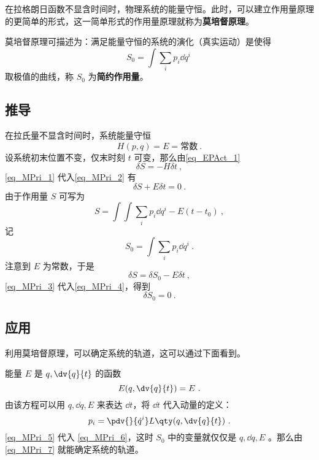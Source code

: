 在拉格朗日函数不显含时间时，物理系统的能量守恒。此时，可以建立作用量原理的更简单的形式，这一简单形式的作用量原理就称为\textbf{莫培督原理}。

莫培督原理可描述为：满足能量守恒的系统的演化（真实运动）是使得
\begin{equation}
S_0=\int\sum_i p_i\dd q^i~
\end{equation}
取极值的曲线，称 $S_0$ 为\textbf{简约作用量}。
\subsection{推导}
在拉氏量不显含时间时，系统能量守恒
\begin{equation}\label{eq_MPri_1}
H(p,q)=E=\text{常数}~.
\end{equation}
设系统初末位置不变，仅末时刻 $t$ 可变，那么由\autoref{eq_EPAct_1} 
\begin{equation}\label{eq_MPri_2}
\delta S=-H\delta t~,
\end{equation}
\autoref{eq_MPri_1} 代入\autoref{eq_MPri_2} 有
\begin{equation}\label{eq_MPri_4}
\delta S+E\delta t=0~.
\end{equation}
由于作用量 $S$ 可写为
\begin{equation}
S=\int \int\sum_i p_i\dd q^i-E(t-t_0)~,
\end{equation}
记
\begin{equation}\label{eq_MPri_6}
S_0=\int\sum_i p_i\dd q^i~.
\end{equation}
注意到 $E$ 为常数，于是
\begin{equation}\label{eq_MPri_3}
\delta S=\delta S_0-E\delta t~,
\end{equation}
\autoref{eq_MPri_3} 代入\autoref{eq_MPri_4}，得到
\begin{equation}\label{eq_MPri_7}
\delta S_0=0~.
\end{equation}
\subsection{应用}
利用莫培督原理，可以确定系统的轨道，这可以通过下面看到。

能量 $E$ 是 $q,\dv{q}{t}$ 的函数 
\begin{equation}
E(q,\dv{q}{t})=E~.
\end{equation}
由该方程可以用 $q,\dd q,E$ 来表达 $\dd t$，将 $\dd t$ 代入动量的定义：
\begin{equation}\label{eq_MPri_5}
p_i=\pdv{}{\dot q^i}L\qty(q,\dv{q}{t})~.
\end{equation}
\autoref{eq_MPri_5} 代入 \autoref{eq_MPri_6}，这时 $S_0$ 中的变量就仅仅是 $q,\dd q, E$ 。那么由\autoref{eq_MPri_7} 就能确定系统的轨道。

